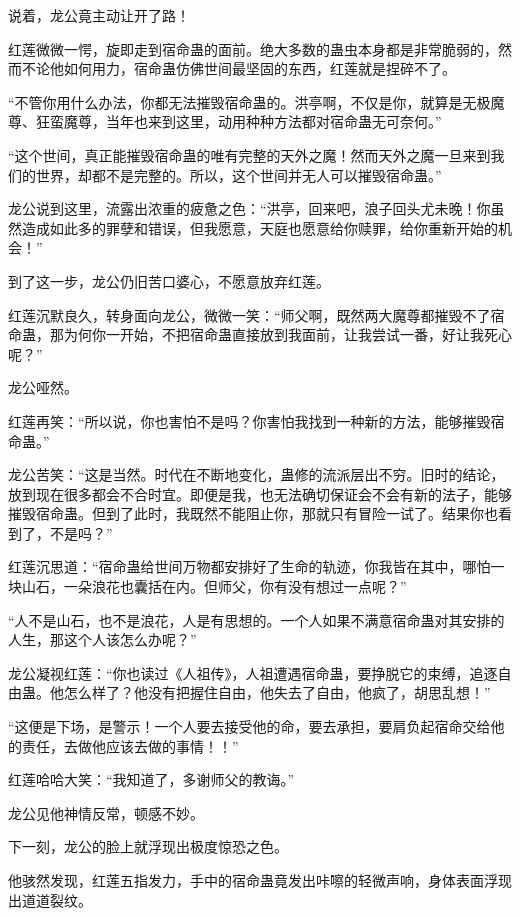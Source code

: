 \begin{this_body}
说着，龙公竟主动让开了路！

红莲微微一愕，旋即走到宿命蛊的面前。绝大多数的蛊虫本身都是非常脆弱的，然而不论他如何用力，宿命蛊仿佛世间最坚固的东西，红莲就是捏碎不了。

“不管你用什么办法，你都无法摧毁宿命蛊的。洪亭啊，不仅是你，就算是无极魔尊、狂蛮魔尊，当年也来到这里，动用种种方法都对宿命蛊无可奈何。”

“这个世间，真正能摧毁宿命蛊的唯有完整的天外之魔！然而天外之魔一旦来到我们的世界，却都不是完整的。所以，这个世间并无人可以摧毁宿命蛊。”

龙公说到这里，流露出浓重的疲惫之色：“洪亭，回来吧，浪子回头尤未晚！你虽然造成如此多的罪孽和错误，但我愿意，天庭也愿意给你赎罪，给你重新开始的机会！”

到了这一步，龙公仍旧苦口婆心，不愿意放弃红莲。

红莲沉默良久，转身面向龙公，微微一笑：“师父啊，既然两大魔尊都摧毁不了宿命蛊，那为何你一开始，不把宿命蛊直接放到我面前，让我尝试一番，好让我死心呢？”

龙公哑然。

红莲再笑：“所以说，你也害怕不是吗？你害怕我找到一种新的方法，能够摧毁宿命蛊。”

龙公苦笑：“这是当然。时代在不断地变化，蛊修的流派层出不穷。旧时的结论，放到现在很多都会不合时宜。即便是我，也无法确切保证会不会有新的法子，能够摧毁宿命蛊。但到了此时，我既然不能阻止你，那就只有冒险一试了。结果你也看到了，不是吗？”

红莲沉思道：“宿命蛊给世间万物都安排好了生命的轨迹，你我皆在其中，哪怕一块山石，一朵浪花也囊括在内。但师父，你有没有想过一点呢？”

“人不是山石，也不是浪花，人是有思想的。一个人如果不满意宿命蛊对其安排的人生，那这个人该怎么办呢？”

龙公凝视红莲：“你也读过《人祖传》，人祖遭遇宿命蛊，要挣脱它的束缚，追逐自由蛊。他怎么样了？他没有把握住自由，他失去了自由，他疯了，胡思乱想！”

“这便是下场，是警示！一个人要去接受他的命，要去承担，要肩负起宿命交给他的责任，去做他应该去做的事情！！”

红莲哈哈大笑：“我知道了，多谢师父的教诲。”

龙公见他神情反常，顿感不妙。

下一刻，龙公的脸上就浮现出极度惊恐之色。

他骇然发现，红莲五指发力，手中的宿命蛊竟发出咔嚓的轻微声响，身体表面浮现出道道裂纹。


\end{this_body}
